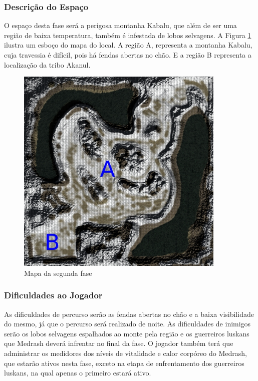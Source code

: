 \subsubsection{Descrição do Espaço}

O espaço desta fase será a perigosa montanha Kabalu, que além de ser uma região de baixa temperatura, também é infestada de lobos selvagens. A Figura \ref{fig:MapaDaFase2} ilustra um esboço do mapa do local. A região A, representa a montanha Kabalu, cuja travessia é difícil, pois há fendas abertas no chão. E a região B representa a localização da tribo Akanul.

\begin{figure}
\centering
\includegraphics[width=10cm]{fases_mapa_2.jpg} 
\caption{Mapa da segunda fase}
\label{fig:MapaDaFase2}
\end{figure}

\subsubsection{Dificuldades ao Jogador}

As dificuldades de percurso serão as fendas abertas no chão e a baixa visibilidade do mesmo, já que o percurso será realizado de noite. As dificuldades de inimigos serão os lobos selvagens espalhados ao monte pela região e os guerreiros luskans que Medrash deverá infrentar no final da fase. O jogador também terá que administrar os medidores dos níveis de vitalidade e calor corpóreo do Medrash, que estarão ativos nesta fase, exceto na etapa de enfrentamento dos guerreiros luskans, na qual apenas o primeiro estará ativo.


